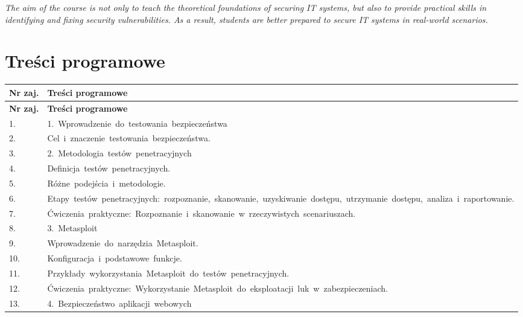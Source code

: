 \documentclass[12pt, a4paper]{article}
\newcommand{\thdrule}{\noalign{\global\setlength{\extrarowheight}{0pt}}}
\newcommand{\thdend}{\noalign{\global\setlength{\extrarowheight}{3pt}}}
\begin{document}
\textit{The aim of the course is not only to teach the theoretical foundations of securing IT systems, but also to provide practical skills in identifying and fixing security vulnerabilities. As a result, students are better prepared to secure IT systems in real-world scenarios.}


\section{Treści programowe}

{\scriptsize
\begin{longtable}{m{1.5cm}m{14.5cm}}
\thdrule\toprule
\rowcolor{pjatkRed} {\color{white}\textbf{Nr zaj.}} & {\color{white}\textbf{Treści programowe}} \\
\midrule\thdend
\endfirsthead
\thdrule\toprule
\rowcolor{pjatkRed} {\color{white}\textbf{Nr zaj.}} & {\color{white}\textbf{Treści programowe}} \\
\midrule\thdend
\endhead
  \rowcolor{tableRowLight} 1. & 1. Wprowadzenie do testowania bezpieczeństwa \\
  \rowcolor{tableRowAlt} 2. & Cel i znaczenie testowania bezpieczeństwa. \\
  \rowcolor{tableRowLight} 3. & 2. Metodologia testów penetracyjnych \\
  \rowcolor{tableRowAlt} 4. & Definicja testów penetracyjnych. \\
  \rowcolor{tableRowLight} 5. & Różne podejścia i metodologie. \\
  \rowcolor{tableRowAlt} 6. & Etapy testów penetracyjnych: rozpoznanie, skanowanie, uzyskiwanie dostępu, utrzymanie dostępu, analiza i raportowanie. \\
  \rowcolor{tableRowLight} 7. & Ćwiczenia praktyczne: Rozpoznanie i skanowanie w rzeczywistych scenariuszach. \\
  \rowcolor{tableRowAlt} 8. & 3. Metasploit \\
  \rowcolor{tableRowLight} 9. & Wprowadzenie do narzędzia Metasploit. \\
  \rowcolor{tableRowAlt} 10. & Konfiguracja i podstawowe funkcje. \\
  \rowcolor{tableRowLight} 11. & Przykłady wykorzystania Metasploit do testów penetracyjnych. \\
  \rowcolor{tableRowAlt} 12. & Ćwiczenia praktyczne: Wykorzystanie Metasploit do eksploatacji luk w zabezpieczeniach. \\
  \rowcolor{tableRowLight} 13. & 4. Bezpieczeństwo aplikacji webowych \\

\end{longtable}}
\end{document}
